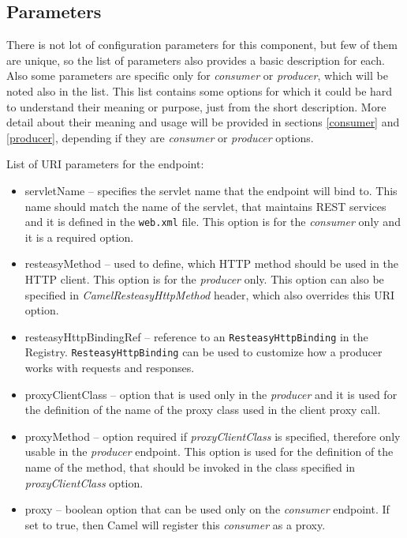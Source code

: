 \documentclass[12pt,final,oneside]{fithesis2}
\begin{document}
\subsection{Parameters}
There is not lot of configuration parameters for this component, but few of them are unique, so the list of parameters also provides a basic description for each. Also some parameters are specific only for \textit{consumer} or \textit{producer}, which will be noted also in the list. This list contains some options for which it could be hard to understand their meaning or purpose, just from the short description. More detail about their meaning and usage will be provided in sections \ref{consumer} and \ref{producer}, depending if they are \textit{consumer} or \textit{producer} options.  

List of URI parameters for the endpoint:
\begin{itemize}
\item
servletName -- specifies the servlet name that the endpoint will bind to. This name should match the name of the servlet, that maintains REST services and it is defined in the \texttt{web.xml} file. This option is for the \textit{consumer} only and it is a required option. 

\item
resteasyMethod -- used to define, which HTTP method should be used in the HTTP client. This option is for the \textit{producer} only. This option can also be specified in \textit{CamelResteasyHttpMethod} header, which also overrides this URI option.

\item
resteasyHttpBindingRef --  reference to an \texttt{ResteasyHttpBinding} in the Registry. \texttt{ResteasyHttpBinding} can be used to customize how a producer works with requests and responses.

\item
proxyClientClass -- option that is used only in the \textit{producer} and it is used for the definition of the name of the proxy class used in the client proxy call.

\item    
proxyMethod -- option required if \textit{proxyClientClass} is specified, therefore only usable in the \textit{producer} endpoint. This option is used for the definition of the name of the method, that should be invoked in the class specified in \textit{proxyClientClass} option.

\item
proxy -- boolean option that can be used only on the \textit{consumer} endpoint. If set to true, then Camel will register this \textit{consumer} as a proxy. 


\end{itemize}
\end{document}
